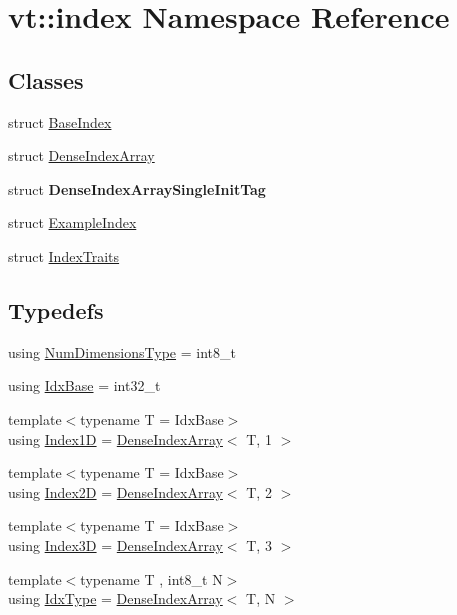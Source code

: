 \hypertarget{namespacevt_1_1index}{}\section{vt\+:\+:index Namespace Reference}
\label{namespacevt_1_1index}
\subsection*{Classes}
\begin{DoxyCompactItemize}
\item 
struct \hyperlink{structvt_1_1index_1_1_base_index}{Base\+Index}
\item 
struct \hyperlink{structvt_1_1index_1_1_dense_index_array}{Dense\+Index\+Array}
\item 
struct {\bfseries Dense\+Index\+Array\+Single\+Init\+Tag}
\item 
struct \hyperlink{structvt_1_1index_1_1_example_index}{Example\+Index}
\item 
struct \hyperlink{structvt_1_1index_1_1_index_traits}{Index\+Traits}
\end{DoxyCompactItemize}
\subsection*{Typedefs}
\begin{DoxyCompactItemize}
\item 
using \hyperlink{namespacevt_1_1index_a97aa9370711425850c86bcb7a20d73e8}{Num\+Dimensions\+Type} = int8\+\_\+t
\item 
using \hyperlink{namespacevt_1_1index_a0dbb8d47463da27c1436e8e4ddb02743}{Idx\+Base} = int32\+\_\+t
\item 
{\footnotesize template$<$typename T  = Idx\+Base$>$ }\\using \hyperlink{namespacevt_1_1index_a091a4f5a7a2c993d9727eaa60cf67d81}{Index1D} = \hyperlink{structvt_1_1index_1_1_dense_index_array}{Dense\+Index\+Array}$<$ T, 1 $>$
\item 
{\footnotesize template$<$typename T  = Idx\+Base$>$ }\\using \hyperlink{namespacevt_1_1index_a8373801efc8343f24d6e8ba57df40a69}{Index2D} = \hyperlink{structvt_1_1index_1_1_dense_index_array}{Dense\+Index\+Array}$<$ T, 2 $>$
\item 
{\footnotesize template$<$typename T  = Idx\+Base$>$ }\\using \hyperlink{namespacevt_1_1index_a2c09a09f7346d370a0bcbbfb0d4459cd}{Index3D} = \hyperlink{structvt_1_1index_1_1_dense_index_array}{Dense\+Index\+Array}$<$ T, 3 $>$
\item 
{\footnotesize template$<$typename T , int8\+\_\+t N$>$ }\\using \hyperlink{namespacevt_1_1index_a939bace7aba6cd4a76b2c12a138c5991}{Idx\+Type} = \hyperlink{structvt_1_1index_1_1_dense_index_array}{Dense\+Index\+Array}$<$ T, N $>$
\end{DoxyCompactItemize}
